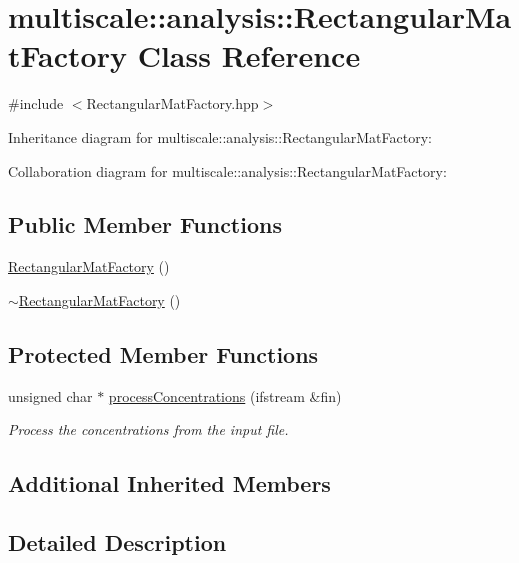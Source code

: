 \hypertarget{classmultiscale_1_1analysis_1_1RectangularMatFactory}{\section{multiscale\-:\-:analysis\-:\-:Rectangular\-Mat\-Factory Class Reference}
\label{classmultiscale_1_1analysis_1_1RectangularMatFactory}
}


{\ttfamily \#include $<$Rectangular\-Mat\-Factory.\-hpp$>$}



Inheritance diagram for multiscale\-:\-:analysis\-:\-:Rectangular\-Mat\-Factory\-:


Collaboration diagram for multiscale\-:\-:analysis\-:\-:Rectangular\-Mat\-Factory\-:
\subsection*{Public Member Functions}
\begin{DoxyCompactItemize}
\item 
\hyperlink{classmultiscale_1_1analysis_1_1RectangularMatFactory_a20b4c70b7964fb40c4767ab2d7e1ae92}{Rectangular\-Mat\-Factory} ()
\item 
\hyperlink{classmultiscale_1_1analysis_1_1RectangularMatFactory_a3ebedd3691965c3d89c3ecdaa3e66d70}{$\sim$\-Rectangular\-Mat\-Factory} ()
\end{DoxyCompactItemize}
\subsection*{Protected Member Functions}
\begin{DoxyCompactItemize}
\item 
unsigned char $\ast$ \hyperlink{classmultiscale_1_1analysis_1_1RectangularMatFactory_a82d24e96f1904577c693605ecc9675a5}{process\-Concentrations} (ifstream \&fin)
\begin{DoxyCompactList}\small\item\em Process the concentrations from the input file. \end{DoxyCompactList}\end{DoxyCompactItemize}
\subsection*{Additional Inherited Members}


\subsection{Detailed Description}


